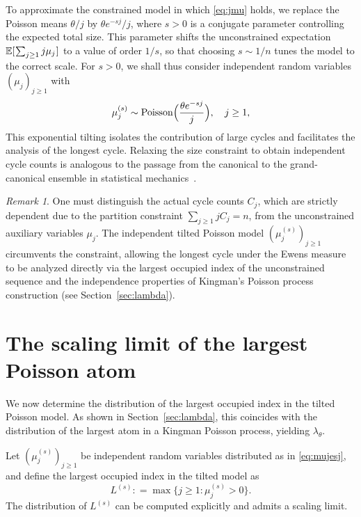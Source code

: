 \documentclass{amsart}
\theoremstyle{definition}
\theoremstyle{remark}
\newtheorem{remark}[theorem]{Remark}
\numberwithin{equation}{section}
\newcommand{\mku}{\mkern1mu}
\newcommand{\deq}{\mathrel{\mathop:}=}
\newcommand{\EE}{\mathbb{E}}
\DeclareMathOperator{\Poi}{Poisson}
\begin{document}
To approximate the constrained model in which \eqref{eq:jmu} holds, we replace the Poisson means $\theta/j$ by $\theta e^{-sj}/j$, where $s > 0$ is a conjugate parameter controlling the expected total size. This parameter shifts the unconstrained expectation $\EE[\mku\sum_{j \ge 1} j\mu_j\mku]$ to a value of order $1/s$, so that choosing $s \sim 1/n$ tunes the model to the correct scale. For $s>0$, we shall thus consider independent random variables $(\mu_{j})_{j \ge 1}$ with
\begin{equation}
\label{eq:mujesj}
\mu_{j}^{(s)} \sim \Poi\Bigl(\frac{\theta e^{-sj}}{j}\Bigr), \quad j \ge 1,
\end{equation}
This exponential tilting isolates the contribution of large cycles and facilitates the analysis of the longest cycle. Relaxing the size constraint to obtain independent cycle counts is analogous to the passage from the canonical to the grand-canonical ensemble in statistical mechanics~\cite{Campisi2024}.

\begin{remark}
\label{rmk:poissonmodel}
One must distinguish the actual cycle counts $C_{j}$, which are strictly dependent due to the partition constraint $\sum_{j \ge 1} jC_{j} = n$, from the unconstrained auxiliary variables $\mu_{j}$.  The independent tilted Poisson model $(\mu_{j}^{(s)})_{j \ge 1}$ circumvents the constraint, allowing the longest cycle under the Ewens measure to be analyzed directly via the largest occupied index of the unconstrained sequence and the independence properties of Kingman's Poisson process construction (see Section~\ref{sec:lambda}).
\end{remark}


\section{The scaling limit of the largest Poisson atom}
\label{sec:scaling}

We now determine the distribution of the largest occupied index in the tilted Poisson model. As shown in Section~\ref{sec:lambda}, this coincides with the distribution of the largest atom in a Kingman Poisson process, yielding $\lambda_{\theta}$.

Let $(\mu_{j}^{(s)})_{j \ge 1}$ be independent random variables distributed as in \eqref{eq:mujesj}, and define the largest occupied index in the tilted model as
\begin{equation}
L^{(s)} \deq \max\{j \ge 1 \colon \mu_{j}^{(s)} > 0\}.
\end{equation}
The distribution of $L^{(s)}$ can be computed explicitly and admits a scaling limit.
\end{document}
